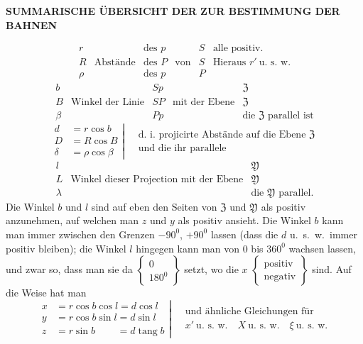\clearpage
\thispagestyle{empty}
\noindent{}%
%
\parbox[t]{\dimexpr\linewidth-24mm\relax}{\centering\fontsize{7.4}{9.2}\selectfont\bfseries SUMMARISCHE ÜBERSICHT DER ZUR BESTIMMUNG DER BAHNEN\par}%
\makebox[12mm][r]{}\par\nobreak\smallskip
\[
\begin{array}{c|c|c|c|c|l}
r&&\text{des }p&&S&\text{alle positiv.}\\
R&\text{Abstände}&\text{des }P&\text{von}&S&\text{Hieraus }r'\ \text{u.\ s.\ w.}\\
\rho&&\text{des }p&&P&
\end{array}
\]
\[
\begin{array}{c|c|c|c|l}
b&&Sp&&\mathfrak{Z}\\
B&\text{Winkel der Linie}&SP&\text{mit der Ebene}&\mathfrak{Z}\\
\beta&&Pp&&\text{die }\mathfrak{Z}\text{ parallel ist}
\end{array}
\]
\[
\left.\begin{aligned}
d&=r\cos b\\D&=R\cos B\\\delta&=\rho\cos\beta
\end{aligned}\right|\quad
\begin{gathered}\text{d.\ i.\ projicirte Abstände auf die Ebene }\mathfrak{Z}\\\text{und die ihr parallele}\end{gathered}
\]
\[
\begin{array}{c|c|l}
l&&\mathfrak{Y}\\
L&\text{Winkel dieser Projection mit der Ebene}&\mathfrak{Y}\\
\lambda&&\text{die }\mathfrak{Y}\text{ parallel.}
\end{array}
\]
Die Winkel $b$ und $l$ sind auf eben den Seiten von $\mathfrak{Z}$ und $\mathfrak{Y}$ als positiv anzunehmen, auf welchen man $z$ und $y$ als positiv ansieht. Die Winkel $b$ kann man immer zwischen den Grenzen $-90^0$, $+90^0$ lassen (dass die $d$ u.\ s.\ w.\ immer positiv bleiben); die Winkel $l$ hingegen kann man von $0$ bis $360^0$ wachsen lassen, und zwar so, dass man sie da $\left\{\begin{smallmatrix}0\\180^0\end{smallmatrix}\right\}$ setzt, wo die $x$ $\left\{\begin{smallmatrix}\text{positiv}\\\text{negativ}\end{smallmatrix}\right\}$ sind. Auf die Weise hat man
\[
\left.\begin{aligned}
x&=r\cos b\cos l=d\cos l\\
y&=r\cos b\sin l=d\sin l\\
z&=r\sin b\phantom{\cos l}=d\operatorname{tang}b
\end{aligned}\right|\quad
\begin{gathered}\text{und ähnliche Gleichungen für}\\x'\ \text{u.\ s.\ w.}\quad X\ \text{u.\ s.\ w.}\quad\xi\ \text{u.\ s.\ w.}\end{gathered}
\]

